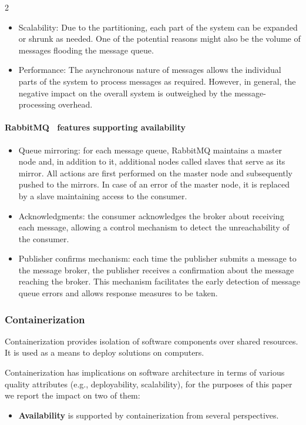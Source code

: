\documentclass{article}
\begin{document}
\begin{multicols}{2}
\begin{itemize}
    On the other hand, without considering other mechanisms, the message queue becomes a single point of failure, potentially disabling the whole system.
    \item Scalability: Due to the partitioning, each part of the system can be expanded or shrunk as needed. One of the potential reasons might also be the volume of messages flooding the message queue.
    \item Performance: The asynchronous nature of messages allows the individual parts of the system to process messages as required. However, in general, the negative impact on the overall system is outweighed by the message-processing overhead.
\end{itemize}

\paragraph{RabbitMQ~\cite{rabbitmq2024Dec} features supporting availability} \label{par:rabbitmq-availability}

\begin{itemize}
    \item Queue mirroring: for each message queue, RabbitMQ maintains a master node and, in addition to it, additional nodes called slaves that serve as its mirror. All actions are first performed on the master node and subsequently pushed to the mirrors. In case of an error of the master node, it is replaced by a slave maintaining access to the consumer.
    \item Acknowledgments: the consumer acknowledges the broker about receiving each message, allowing a control mechanism to detect the unreachability of the consumer.
    \item Publisher confirms mechanism: each time the publisher submits a message to the message broker, the publisher receives a confirmation about the message reaching the broker. This mechanism facilitates the early detection of message queue errors and allows response measures to be taken.
\end{itemize}

\subsubsection{Containerization}
Containerization provides isolation of software components over shared resources. It is used as a means to deploy solutions on computers. 

Containerization has implications on software architecture in terms of various quality attributes (e.g., deployability, scalability), for the purposes of this paper we report the impact on two of them:
\begin{itemize}
    \item \textbf{Availability} is supported by containerization from several perspectives.
    

\end{itemize}
\end{multicols}
\end{document}
